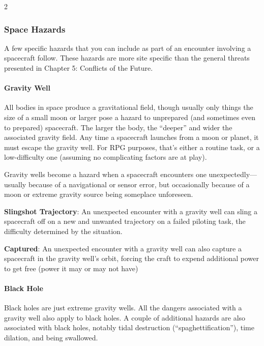 \begin{multicols}{2}

\subsubsection{Space Hazards}

A few specific hazards that you can include as part of an encounter involving a spacecraft follow. These hazards are more site specific than the general threats presented in Chapter 5: Conflicts of the Future.

\paragraph{Gravity Well}

All bodies in space produce a gravitational field, though usually only things the size of a small moon or larger pose a hazard to unprepared (and sometimes even to prepared) spacecraft. The larger the body, the “deeper” and wider the associated gravity field. Any time a spacecraft launches from a moon or planet, it must escape the gravity well. For RPG purposes, that’s either a routine task, or a low-difficulty one (assuming no complicating factors are at play). 

Gravity wells become a hazard when a spacecraft encounters one unexpectedly— usually because of a navigational or sensor error, but occasionally because of a moon or extreme gravity source being someplace unforeseen. 

\textbf{Slingshot Trajectory}: An unexpected encounter with a gravity well can sling a spacecraft off on a new and unwanted trajectory on a failed piloting task, the difficulty determined by the situation.

\textbf{Captured}: An unexpected encounter with a gravity well can also capture a spacecraft in the gravity well’s orbit, forcing the craft to expend additional power to get free (power it may or may not have)

\paragraph{Black Hole}

Black holes are just extreme gravity wells. All the dangers associated with a gravity well also apply to black holes. A couple of additional hazards are also associated with black holes, notably tidal destruction (“spaghettification”), time dilation, and being swallowed.


\end{multicols}
